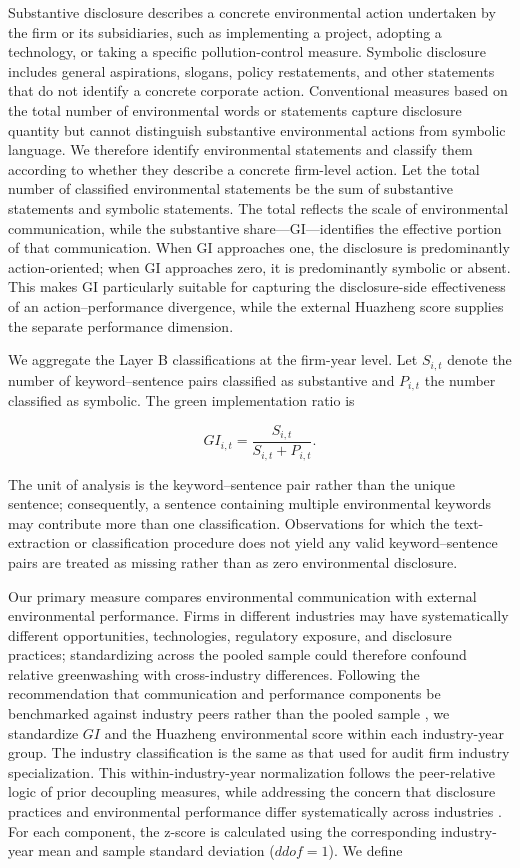 \documentclass[11pt]{article}
\begin{document}
Substantive disclosure describes a concrete environmental action undertaken by the firm or its subsidiaries, such as implementing a project, adopting a technology, or taking a specific pollution-control measure. 
Symbolic disclosure includes general aspirations, slogans, policy restatements, and other statements that do not identify a concrete corporate action.
Conventional measures based on the total number of environmental words or statements capture disclosure quantity but cannot distinguish substantive environmental actions from symbolic language. 
We therefore identify environmental statements and classify them according to whether they describe a concrete firm-level action. 
Let the total number of classified environmental statements be the sum of substantive statements and symbolic statements. 
The total reflects the scale of environmental communication, 
while the substantive share---GI---identifies the effective portion of that communication. 
When GI approaches one, the disclosure is predominantly action-oriented; 
when GI approaches zero, it is predominantly symbolic or absent. 
This makes GI particularly suitable for capturing the disclosure-side effectiveness of an action--performance divergence, 
while the external Huazheng score supplies the separate performance dimension.

We aggregate the Layer B classifications at the firm-year level. 
Let \(S_{i,t}\) denote the number of keyword--sentence pairs classified as substantive and \(P_{i,t}\) the number classified as symbolic. 
The green implementation ratio is

\[
GI_{i,t}=\frac{S_{i,t}}{S_{i,t}+P_{i,t}}.
\]

The unit of analysis is the keyword--sentence pair rather than the unique sentence; 
consequently, a sentence containing multiple environmental keywords may contribute more than one classification. 
Observations for which the text-extraction or classification procedure does not yield any valid keyword--sentence pairs are treated as missing rather than as zero environmental disclosure. 


Our primary measure compares environmental communication with external environmental performance. 
Firms in different industries may have systematically different opportunities, technologies, regulatory exposure, 
and disclosure practices; standardizing across the pooled sample could therefore confound relative greenwashing with cross-industry differences. 
Following the recommendation that communication and performance components be benchmarked against industry peers rather than the pooled sample \citep{lubloy2025quantifying,yu2020greenwashing}, 
we standardize \(GI\) and the Huazheng environmental score within each industry-year group. 
The industry classification is the same as that used for audit firm industry specialization. 
This within-industry-year normalization follows the peer-relative logic of prior decoupling measures, 
while addressing the concern that disclosure practices and environmental performance differ systematically across industries \citep{yu2020greenwashing,lubloy2025quantifying}. 
For each component, the z-score is calculated using the corresponding industry-year mean and sample standard deviation (\(ddof=1\)). We define
\end{document}
